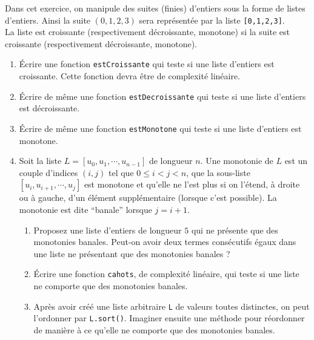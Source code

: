 \begin{exercice}
Dans cet exercice, on manipule des suites (finies) d'entiers sous la forme de listes d'entiers. Ainsi la suite $(0,1,2,3)$ sera représentée par la liste \texttt{[0,1,2,3]}.\\
La liste est croissante (respectivement décroissante, monotone) si la suite est croissante (respectivement décroissante, monotone).
\begin{enumerate}
\item \'Ecrire une fonction \texttt{estCroissante} qui teste si une liste d'entiers est croissante. Cette fonction devra être de complexité linéaire.
\item \'Ecrire de même une fonction \texttt{estDecroissante} qui teste si une liste d'entiers est décroissante.
\item \'Ecrire de même une fonction \texttt{estMonotone} qui teste si une liste d'entiers est monotone.
\item Soit la liste $L=[u_0,u_1,\cdots,u_{n-1}]$ de longueur $n$. Une monotonie de $L$ est un couple d'indices $(i,j)$ tel que $0\leq i < j < n$, que la sous-liste $[u_i,u_{i+1},\cdots,u_{j}]$ est monotone et qu'elle ne l'est plus si on l'étend, à droite ou à gauche, d'un élément supplémentaire (lorsque c'est possible). La monotonie est dite ``banale'' lorsque $j=i+1$.
\begin{enumerate}
\item Proposez une liste d'entiers de longueur $5$ qui ne présente que des monotonies banales. Peut-on avoir deux termes consécutifs égaux dans une liste ne présentant que des monotonies banales ?
\item \'Ecrire une fonction \texttt{cahots}, de complexité linéaire, qui teste si une liste ne comporte que des monotonies banales.
\item Après avoir créé une liste arbitraire \texttt{L} de valeurs toutes distinctes, on peut l'ordonner par \texttt{L.sort()}. Imaginer ensuite une méthode pour réordonner de manière à ce qu'elle ne comporte que des monotonies banales.
\end{enumerate}
\end{enumerate}

\end{exercice}






